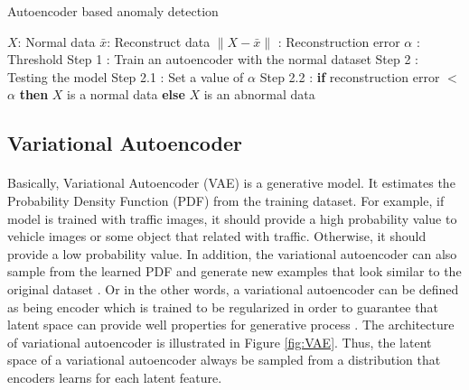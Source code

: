 \renewcommand{\algorithmicrequire}{\textbf{Input:}}
\renewcommand{\algorithmicensure}{\textbf{Output:}}
\renewcommand{\algorithmicforall}{\textbf{for each}}

\begin{algorithm}[H]
\caption{Autoencoder based anomaly detection }
\label{al:anomaly_detection_algorithm}
\begin{algorithmic}
  \REQUIRE $X$: Normal data
  \ENSURE $\bar{x} $: Reconstruct data
  \STATE $\| X - \bar{x} \|$ : Reconstruction error
  \STATE $\alpha$ : Threshold
  \STATE Step 1 : Train an autoencoder with the normal dataset 
  \STATE Step 2 : Testing the model
  \STATE \indent Step 2.1 : Set a value of $\alpha$
  \STATE \indent Step 2.2 : \textbf{if} reconstruction error $<$ $\alpha$ \textbf{then} $X$ is a normal data
  \STATE \indent \indent \indent \textbf{else} $X$ is an abnormal data
\end{algorithmic}
\end{algorithm}

\subsection{Variational Autoencoder}
\paragraph{}
Basically, Variational Autoencoder (VAE) is a generative model. It estimates the Probability Density Function (PDF) from the training dataset. For example, if model is trained with traffic images, it should provide a high probability value to vehicle images or some object that related with traffic. Otherwise, it should provide a low probability value. In addition, the variational autoencoder can also sample from the learned PDF and generate new examples that look similar to the original dataset \cite{roger_2021}. Or in the other words, a variational autoencoder can be defined as being encoder which is trained to be regularized in order to guarantee that latent space can provide well properties for generative process \cite{rocca_2020}. The architecture of variational autoencoder is illustrated in Figure \ref{fig:VAE}. Thus, the latent space of a variational autoencoder always be sampled from a distribution that encoders learns for each latent feature. 

